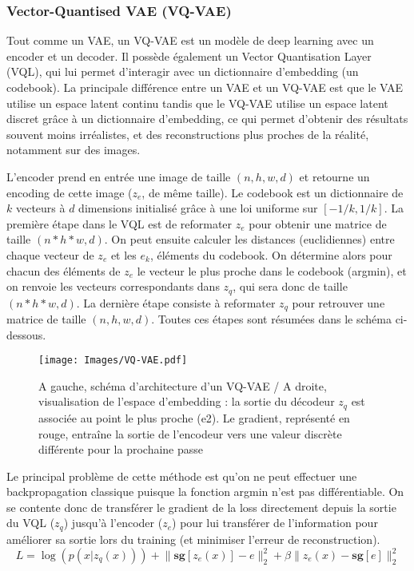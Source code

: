 \documentclass{article}
\begin{document}
\subsubsection{Vector-Quantised VAE (VQ-VAE)}

Tout comme un VAE, un VQ-VAE est un modèle de deep learning avec un encoder et un decoder. Il possède également un Vector Quantisation Layer (VQL), qui lui permet d'interagir avec un dictionnaire d'embedding (un codebook). La principale différence entre un VAE et un VQ-VAE est que le VAE utilise un espace latent continu tandis que le VQ-VAE utilise un espace latent discret grâce à un dictionnaire d'embedding, ce qui permet d'obtenir des résultats souvent moins irréalistes, et des reconstructions plus proches de la réalité, notamment sur des images. 

L'encoder prend en entrée une image de taille $(n, h, w, d)$ et retourne un encoding de cette image ($z_e$, de même taille). 
Le codebook est un dictionnaire de $k$ vecteurs à $d$ dimensions initialisé grâce à une loi uniforme sur $[-1/k, 1/k]$. 
La première étape dans le VQL est de reformater $z_e$ pour obtenir une matrice de taille $(n*h*w, d)$. On peut ensuite calculer les distances (euclidiennes) entre chaque vecteur de $z_e$ et les $e_k$, éléments du codebook. On détermine alors pour chacun des éléments de $z_e$ le vecteur le plus proche dans le codebook (argmin), et on renvoie les vecteurs correspondants dans $z_q$, qui sera donc de taille $(n*h*w, d)$. La dernière étape consiste à reformater $z_q$ pour retrouver une matrice de taille $(n,h,w,d)$. Toutes ces étapes sont résumées dans le schéma ci-dessous. 

\begin{figure}[H]
    \centering
    \texttt{[image: Images/VQ-VAE.pdf]}
    \caption{A gauche, schéma d'architecture d'un VQ-VAE / A droite, visualisation de l'espace d'embedding : la sortie du décodeur $z_q$ est associée au point le plus proche (e2). Le gradient, représenté en rouge, entraîne la sortie de l'encodeur vers une valeur discrète différente pour la prochaine passe \cite{Avd2017VQVAE} }
\end{figure}

Le principal problème de cette méthode est qu'on ne peut effectuer une backpropagation classique puisque la fonction argmin n'est pas différentiable. On se contente donc de transférer le gradient de la loss directement depuis la sortie du VQL ($z_q$) jusqu'à l'encoder ($z_e$) pour lui transférer de  l'information pour améliorer sa sortie lors du training (et minimiser l'erreur de reconstruction).
\large
$$L = \log(p(x|z_q(x))) +  \lVert\textbf{sg}[z_e(x)] - e \rVert_2^2 + \beta \lVert z_e(x)- \textbf{sg}[e]\rVert_2^2$$
\normalsize
\end{document}
